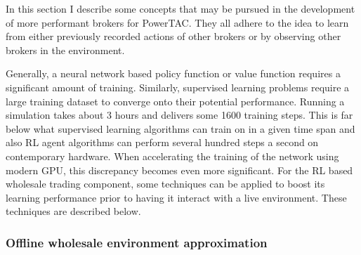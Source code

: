 In this section I describe some concepts that may be pursued in the development of more performant brokers for
\ac{PowerTAC}. They all adhere to the idea to learn from either previously recorded actions of other brokers or by
observing other brokers in the environment.

Generally, a neural network based policy function or value function requires a significant amount of training.
Similarly, supervised learning problems require a large training dataset to converge onto their potential performance.
Running a simulation takes about 3 hours and delivers some 1600 training steps. This is far below what supervised
learning algorithms can train on in a given time span and also \ac{RL} agent algorithms can perform several hundred
steps a second on contemporary hardware. When accelerating the training of the network using modern \ac{GPU}, this
discrepancy becomes even more significant. For the \ac{RL} based wholesale trading component, some techniques can be
applied to boost its learning performance prior to having it interact with a live environment.  These techniques are
described below.

\subsubsection{Offline wholesale environment approximation}%
\label{ssub:offline_record_based_wholesale_environment_approximation}

